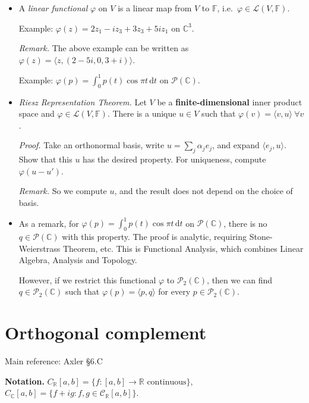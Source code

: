 \documentclass[11pt]{article}
\newcommand{\1}{\mathbf{1}}
\newcommand{\inner}[2]{\langle #1, #2 \rangle}
\newcommand{\dd}{{\mathrm{d}}}
\newcommand{\0}{\mathbf{0}}
\newcommand{\C}{\mathbb{C}}
\newcommand{\R}{\mathbb{R}}
\newcommand{\cP}{\mathcal{P}}
\newcommand{\spitem}{\item[$\circ$]}
\begin{document}
{\begin{itemize}
Example:
compare $T(x,y)=(-y,x)$ on $\R^2$ and $\C^2$.

\item

A \emph{linear functional} $\varphi$ on $V$ is a linear map from $V$ to $\mathbb{F}$, i.e.~$\varphi\in\mathcal{L}(V,\mathbb{F})$.

Example:
$\varphi(z)=2z_1 -i z_3 + 3z_3 + 5i z_1$ on $\C^3$.

\emph{Remark.}
The above example can be written as $\varphi(z) = \inner{z}{(2-5i,0,3+i)}$.

Example:
$\varphi(p)= \int_0^1 p(t) \cos \pi t \, \dd t$ on $\cP(\C)$.


\item

\emph{Riesz Representation Theorem.}
Let $V$ be a \textbf{finite-dimensional} inner product space and $\varphi\in\mathcal{L}(V,\mathbb{F})$. There is a unique $u\in V$ such that $\varphi(v)=\langle v,u\rangle \ \forall v$.

\emph{Proof.}
Take an orthonormal basis, write $u = \sum_j \alpha_j e_j$, and expand $\inner{e_j}{u}$.
Show that this $u$ has the desired property.
For uniqueness, compute $\varphi(u-u')$.

\emph{Remark.}
So we compute $u$, and the result does not depend on the choice of basis.

\spitem

As a remark, for $\varphi(p)= \int_0^1 p(t) \cos \pi t \, \dd t$ on $\cP(\C)$, there is no $q \in \cP(\C)$ with this property.
The proof is analytic, requiring Stone-Weierstrass Theorem, etc.
This is Functional Analysis, which combines Linear Algebra, Analysis and Topology.

However, if we restrict this functional $\varphi$ to $\cP_2(\C)$, then we can find $q \in \cP_2(\C)$ such that $\varphi(p) = \inner{p}{q}$ for every $p \in \cP_2(\C)$.

\end{itemize}


\clearpage
\section{Orthogonal complement}

Main reference:
Axler \S6.C

\textbf{Notation.}
$C_\R[a,b] = \{f:[a,b]\to\R \text{ continuous}\}$,
$C_\C[a,b] = \{f+ig:f,g\in\mathcal{C}_\R[a,b]\}$.

}
\end{document}
